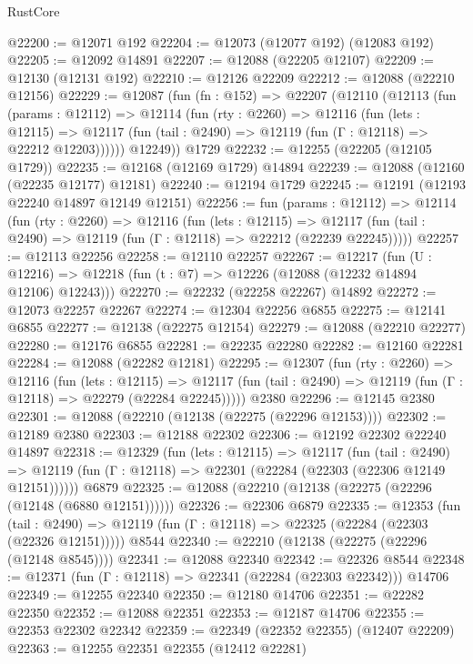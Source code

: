 \begin{lexlean}{RustCore}
\begin{coremodule}
@22200 := @12071 @192
@22204 := @12073 (@12077 @192) (@12083 @192)
@22205 := @12092 @14891
@22207 := @12088 (@22205 @12107)
@22209 := @12130 (@12131 @192)
@22210 := @12126 @22209
@22212 := @12088 (@22210 @12156)
@22229 := @12087
    (fun (fn : @152) =>
    @22207
      (@12110
        (@12113
          (fun (params : @12112) =>
          @12114
            (fun (rty : @2260) =>
            @12116
              (fun (lets : @12115) =>
              @12117 (fun (tail : @2490) => @12119 (fun (Γ : @12118) => @22212 @12203))))))
        @12249))
    @1729
@22232 := @12255 (@22205 (@12105 @1729))
@22235 := @12168 (@12169 @1729) @14894
@22239 := @12088 (@12160 (@22235 @12177) @12181)
@22240 := @12194 @1729
@22245 := @12191 (@12193 @22240 @14897 @12149 @12151)
@22256 := fun (params : @12112) =>
  @12114
    (fun (rty : @2260) =>
    @12116
      (fun (lets : @12115) =>
      @12117 (fun (tail : @2490) => @12119 (fun (Γ : @12118) => @22212 (@22239 @22245)))))
@22257 := @12113 @22256
@22258 := @12110 @22257
@22267 := @12217
    (fun (U : @12216) => @12218 (fun (t : @7) => @12226 (@12088 (@12232 @14894 @12106) @12243)))
@22270 := @22232 (@22258 @22267) @14892
@22272 := @12073 @22257 @22267
@22274 := @12304 @22256 @6855
@22275 := @12141 @6855
@22277 := @12138 (@22275 @12154)
@22279 := @12088 (@22210 @22277)
@22280 := @12176 @6855
@22281 := @22235 @22280
@22282 := @12160 @22281
@22284 := @12088 (@22282 @12181)
@22295 := @12307
    (fun (rty : @2260) =>
    @12116
      (fun (lets : @12115) =>
      @12117 (fun (tail : @2490) => @12119 (fun (Γ : @12118) => @22279 (@22284 @22245)))))
    @2380
@22296 := @12145 @2380
@22301 := @12088 (@22210 (@12138 (@22275 (@22296 @12153))))
@22302 := @12189 @2380
@22303 := @12188 @22302
@22306 := @12192 @22302 @22240 @14897
@22318 := @12329
    (fun (lets : @12115) =>
    @12117
      (fun (tail : @2490) =>
      @12119 (fun (Γ : @12118) => @22301 (@22284 (@22303 (@22306 @12149 @12151))))))
    @6879
@22325 := @12088 (@22210 (@12138 (@22275 (@22296 (@12148 (@6880 @12151))))))
@22326 := @22306 @6879
@22335 := @12353
    (fun (tail : @2490) => @12119 (fun (Γ : @12118) => @22325 (@22284 (@22303 (@22326 @12151)))))
    @8544
@22340 := @22210 (@12138 (@22275 (@22296 (@12148 @8545))))
@22341 := @12088 @22340
@22342 := @22326 @8544
@22348 := @12371 (fun (Γ : @12118) => @22341 (@22284 (@22303 @22342))) @14706
@22349 := @12255 @22340
@22350 := @12180 @14706
@22351 := @22282 @22350
@22352 := @12088 @22351
@22353 := @12187 @14706
@22355 := @22353 @22302 @22342
@22359 := @22349 (@22352 @22355) (@12407 @22209)
@22363 := @12255 @22351 @22355 (@12412 @22281)

\end{coremodule}
\end{lexlean}

